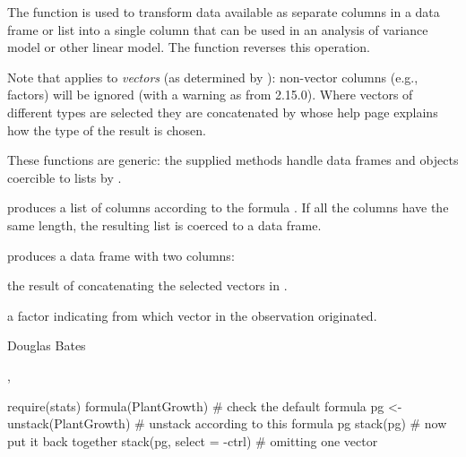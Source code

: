%
\begin{Details}\relax
The  function is used to transform data available as
separate columns in a data frame or list into a single column that can
be used in an analysis of variance model or other linear model.  The
 function reverses this operation.

Note that  applies to \emph{vectors} (as determined by
): non-vector columns (e.g., factors) will be
ignored (with a warning as from \R{} 2.15.0).  Where vectors of
different types are selected they are concatenated by
 whose help page explains how the type of the
result is chosen.

These functions are generic: the supplied methods handle data frames
and objects coercible to lists by .
\end{Details}
%
\begin{Value}
 produces a list of columns according to the formula
.  If all the columns have the same length, the resulting
list is coerced to a data frame.

 produces a data frame with two columns:
\begin{ldescription}
\item[\code{values}] the result of concatenating the selected vectors in
.
\item[\code{ind}] a factor indicating from which vector in  the
observation originated.
\end{ldescription}
\end{Value}
%
\begin{Author}\relax
Douglas Bates
\end{Author}
%
\begin{SeeAlso}\relax
{}, 
\end{SeeAlso}
%
\begin{Examples}
\begin{ExampleCode}
require(stats)
formula(PlantGrowth)         # check the default formula
pg <- unstack(PlantGrowth)   # unstack according to this formula
pg
stack(pg)                    # now put it back together
stack(pg, select = -ctrl)    # omitting one vector
\end{ExampleCode}
\end{Examples}
